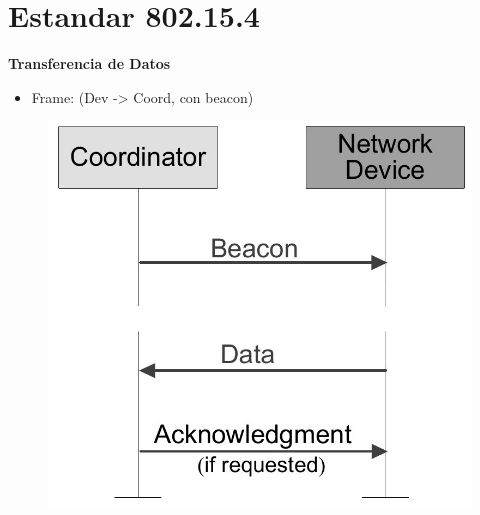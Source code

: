\documentclass[aspectratio=169]{beamer}
\begin{document}
\section{Estandar 802.15.4}


\begin{frame}{\textbf{Transferencia de Datos}}
\begin{minipage}[c]{1.0\linewidth}
	\begin{minipage}[c]{0.6\linewidth}
		\begin{itemize}
			\item Frame: (Dev -> Coord, con beacon)
			\vspace{10px}
	  	\end{itemize}	
	\end{minipage}
	\begin{minipage}[c]{0.35\linewidth}
		\begin{figure}[H]
			\includegraphics[width=1\textwidth]{./imagenes/dev-coord-beacon.jpg}
		\end{figure}	  	  	
	\end{minipage}
\end{minipage}
\end{frame}
\end{document}
